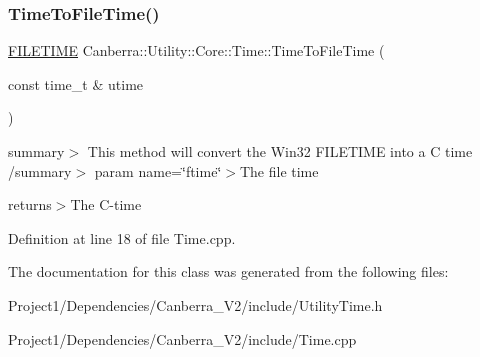 \subsubsection{\texorpdfstring{Time\+To\+File\+Time()}{TimeToFileTime()}}
{\footnotesize\ttfamily \hyperlink{struct___f_i_l_e_t_i_m_e}{F\+I\+L\+E\+T\+I\+ME} Canberra\+::\+Utility\+::\+Core\+::\+Time\+::\+Time\+To\+File\+Time (\begin{DoxyParamCaption}\item[{const time\+\_\+t \&}]{utime }\end{DoxyParamCaption})\hspace{0.3cm}{\ttfamily [static]}}

summary$>$ This method will convert the Win32 F\+I\+L\+E\+T\+I\+ME into a C time /summary$>$ param name=\char`\"{}ftime\char`\"{}$>$The file time

returns$>$The C-\/time

Definition at line 18 of file Time.\+cpp.



The documentation for this class was generated from the following files\+:\begin{DoxyCompactItemize}
\item 
Project1/\+Dependencies/\+Canberra\+\_\+\+V2/include/Utility\+Time.\+h\item 
Project1/\+Dependencies/\+Canberra\+\_\+\+V2/include/Time.\+cpp\end{DoxyCompactItemize}
